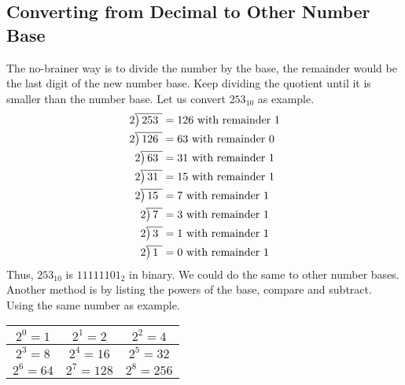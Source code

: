 \documentclass[
]{book}
\begin{document}
\hypertarget{converting-from-decimal-to-other-number-base}{%
\subsection{Converting from Decimal to Other Number
Base}\label{converting-from-decimal-to-other-number-base}}

\noindent The no-brainer way is to divide the number by the base, the
remainder would be the last digit of the new number base. Keep dividing
the quotient until it is smaller than the number base. Let us convert
\(253_{10}\) as example. \begin{equation} \label{eq5}
\begin{split}
2{\overline{\smash{\big)}\,253\phantom{)}}} & = 126 \text{ with remainder }1\\
2{\overline{\smash{\big)}\,126\phantom{)}}} & = 63 \text{ with remainder }0\\
2{\overline{\smash{\big)}\,63\phantom{)}}} & = 31 \text{ with remainder }1\\
2{\overline{\smash{\big)}\,31\phantom{)}}} & = 15 \text{ with remainder }1\\
2{\overline{\smash{\big)}\,15\phantom{)}}} & = 7 \text{ with remainder }1\\
2{\overline{\smash{\big)}\,7\phantom{)}}} & = 3 \text{ with remainder }1\\
2{\overline{\smash{\big)}\,3\phantom{)}}} & = 1 \text{ with remainder }1\\
2{\overline{\smash{\big)}\,1\phantom{)}}} & = 0 \text{ with remainder }1
\end{split}
\end{equation} Thus, \(253_{10}\) is \(11111101_2\) in binary. We could
do the same to other number bases. \newline Another method is by listing
the powers of the base, compare and subtract. Using the same number as
example.

\begin{longtable}[]{@{}ccc@{}}
\toprule\noalign{}
\(2^0 = 1\) & \(2^1 = 2\) & \(2^2 = 4\) \\
\midrule\noalign{}
\endhead
\bottomrule\noalign{}
\endlastfoot
\(2^3 = 8\) & \(2^4 = 16\) & \(2^5 = 32\) \\
\(2^6 = 64\) & \(2^7 = 128\) & \(2^8 = 256\) \\
\end{longtable}
\end{document}

